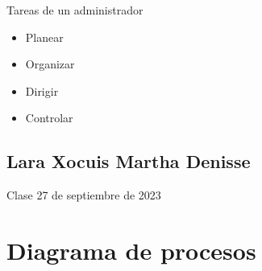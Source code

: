 \documentclass[letterpaper,12pt]{article}
\begin{document}
\begin{sloppypar}
Tareas de un administrador
\begin{itemize}
    \item Planear 
    \item Organizar 
    \item Dirigir 
    \item Controlar
\end{itemize}
\newpage
\subsection*{Lara Xocuis Martha Denisse}
Clase 27 de septiembre de 2023
\section{Diagrama de procesos}
\end{sloppypar}
\end{document}
